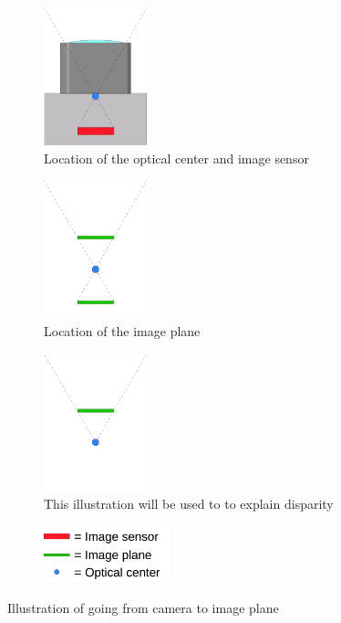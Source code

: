 \begin{figure}[ht]
  \centering
  \begin{subfigure}[t]{0.3\textwidth}
    \centering\includegraphics[height=4cm]{figures/imgplane_1.jpg}
    \caption{Location of the optical center and image sensor\label{fig:imgplane1}}
  \end{subfigure}\hspace{0.5cm}
  \begin{subfigure}[t]{0.3\textwidth}
    \centering\includegraphics[height=4cm]{figures/imgplane_2}
    \caption{Location of the image plane\label{fig:imgplane2}}
  \end{subfigure}\hspace{0.5cm}
  \begin{subfigure}[t]{0.3\textwidth}
    \centering\includegraphics[height=4cm]{figures/imgplane_3}
    \caption{This illustration will be used to to explain disparity\label{fig:imgplane3}}
  \end{subfigure}
  \begin{subfigure}[t]{0.75\textwidth}
    \centering\includegraphics[width=0.4\textwidth]{figures/imgplane_legends}
  \end{subfigure}\hspace{0.5cm}
  \caption{Illustration of going from camera to image plane\label{fig:imgplane_all}}
\end{figure}

